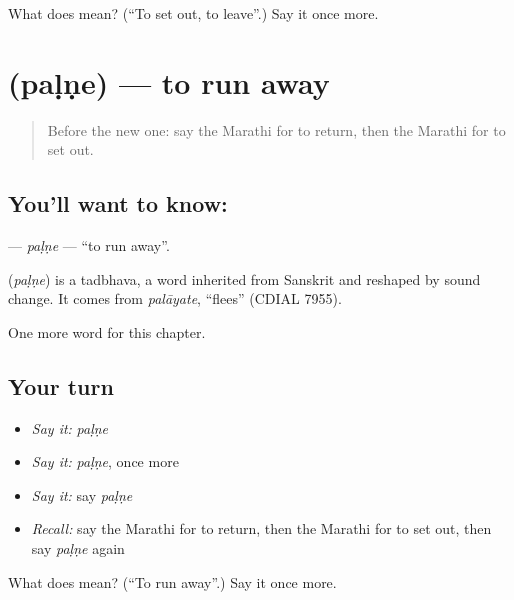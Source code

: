 \begin{tcolorbox}[breakable,colback=teal!4,colframe=teal!35!black,title={Before you move on}]
What does  mean? (\textquotedblleft{}To set out, to leave\textquotedblright{}.) Say it once more.
\end{tcolorbox}
\section[\texorpdfstring{\mr{पळणे} (paḷṇe)}{पळणे (paḷṇe)}]{ (paḷṇe) — to run away}

\label{lesson:MR-C154-palne}



\begin{quote}
Before the new one: say the Marathi for to return, then the Marathi for to set out.
\end{quote}

\subsection*{You'll want to know: }
\textbf{} — \emph{paḷṇe} — \textquotedblleft{}to run away\textquotedblright{}.

\begin{cousinweb}
\textbf{} (\emph{paḷṇe}) is a tadbhava, a word inherited from Sanskrit and reshaped by sound change. It comes from \emph{palāyate}, \textquotedblleft{}flees\textquotedblright{} (CDIAL 7955).
\end{cousinweb}

\begin{grammarlens}[title={What you've built}]
One more word for this chapter.
\end{grammarlens}

\subsection*{Your turn}
\begin{itemize}
\raggedright
  \item \emph{Say it:} \emph{paḷṇe}
  \item \emph{Say it:} \emph{paḷṇe}, once more
  \item \emph{Say it:} say \emph{paḷṇe}
  \item \emph{Recall:} say the Marathi for to return, then the Marathi for to set out, then say \emph{paḷṇe} again
\end{itemize}

\begin{tcolorbox}[breakable,colback=teal!4,colframe=teal!35!black,title={Before you move on}]
What does  mean? (\textquotedblleft{}To run away\textquotedblright{}.) Say it once more.
\end{tcolorbox}
